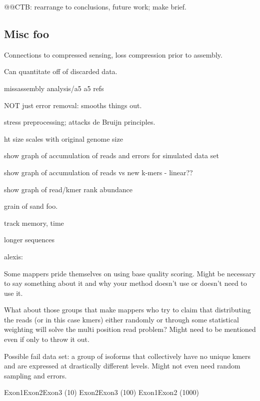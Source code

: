 \documentclass[10pt]{article}
\begin{document}
@@CTB: rearrange to conclusions, future work; make brief.

\subsection*{Misc foo}

Connections to compressed sensing, loss compression prior to assembly.

Can quantitate off of discarded data.





missassembly analysis/a5
a5 refs

NOT just error removal: smooths things out.

stress preprocessing; attacks de Bruijn principles.

ht size scales with original genome size

show graph of accumulation of reads and errors for simulated data set

show graph of accumulation of reads vs new k-mers - linear??

show graph of read/kmer rank abundance

grain of sand foo.


track memory, time

longer sequences

alexis:

Some mappers pride themselves on using base quality scoring.  Might be
necessary to say something about it and why your method doesn't use or
doesn't need to use it.

What about those groups that make mappers who try to claim that
distributing the reads (or in this case kmers) either randomly or
through some statistical weighting will solve the multi position read
problem?  Might need to be mentioned even if only to throw it out.

Possible fail data set: a group of isoforms that collectively have no
unique kmers and are expressed at drastically different levels.  Might
not even need random sampling and errors.

Exon1Exon2Exon3 (10)
Exon2Exon3                (100)
Exon1Exon2             (1000)
\end{document}
